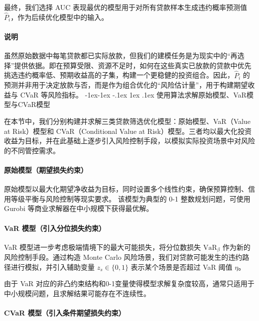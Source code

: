\documentclass[12pt,nonblindrev]{write_paper}
\makeatletter
\renewcommand\subsection{\@startsection{subsection}{2}{\z@}%
                                     {-1ex\@plus -1ex \@minus -.1ex}%
                                     {1ex \@plus .1ex}%
                                     {\normalfont \normalsize \bfseries}}
\makeatother
\begin{document}
最终，我们选择 AUC 表现最优的模型用于对所有贷款样本生成违约概率预测值 $\hat{P}_i$，作为后续优化模型中的输入。

\paragraph{说明}
虽然原始数据中每笔贷款都已实际放款，但我们的建模任务是为现实中的“再选择”提供依据。即在预算受限、资源不足时，如何在这些真实已放款的贷款中优先挑选违约概率低、预期收益高的子集，构建一个更稳健的投资组合。因此，$\hat{P}_i$ 的预测并非用于决定放款与否，而是作为组合优化的“风险估计量”，用于构建期望收益与 CVaR 等风险指标。
\subsection{使用算法求解原始模型、VaR模型与CVaR模型}
\label{subsec:model_solving}

在本节中，我们分别构建并求解三类贷款筛选优化模型：原始模型、VaR（Value at Risk）模型和 CVaR（Conditional Value at Risk）模型。三者均以最大化投资收益为目标，并在此基础上逐步引入风险控制手段，以模拟实际投资场景中对风险的不同管控需求。

\vspace{1em}
\paragraph{原始模型（期望损失约束）}
原始模型以最大化期望净收益为目标，同时设置多个线性约束，确保预算控制、信用等级平衡与风险控制等现实要求。
该模型为典型的 0-1 整数规划问题，可使用 Gurobi 等商业求解器在中小规模下获得最优解。

\vspace{1em}
\paragraph{VaR 模型（引入分位损失约束）}

VaR 模型进一步考虑极端情境下的最大可能损失，将分位数损失 $\text{VaR}_\beta$ 作为新的风险控制手段。通过构造 Monte Carlo 风险场景，我们对贷款可能发生的违约路径进行模拟，并引入辅助变量 $z_s \in \{0,1\}$ 表示某个场景是否超过 VaR 阈值 $\eta$。

由于 VaR 对应的非凸约束结构和0-1变量使得模型求解复杂度较高，通常只适用于中小规模问题，且求解结果可能存在不连续性。

\vspace{1em}
\paragraph{CVaR 模型（引入条件期望损失约束）}
\end{document}
